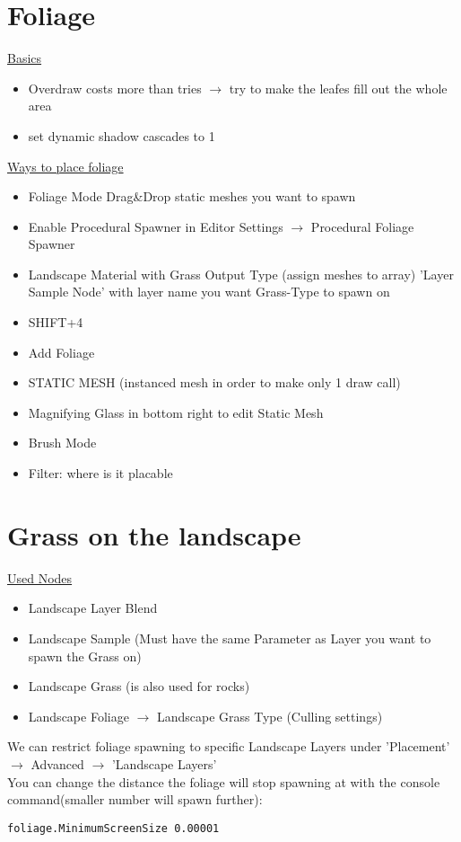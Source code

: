     \section{Foliage}
        \underline{Basics}
        \begin{itemize}
            \item Overdraw costs more than tries $\rightarrow$ try to make the leafes fill out the whole area
            \item set dynamic shadow cascades to 1
        \end{itemize}

        \underline{Ways to place foliage}
        \begin{itemize}
            \item Foliage Mode Drag\&Drop static meshes you want to spawn
            \item Enable Procedural Spawner in Editor Settings $\rightarrow$ Procedural Foliage Spawner
            \item Landscape Material with Grass Output Type (assign meshes to array) 'Layer Sample Node' with layer name you want Grass-Type to spawn on
        \end{itemize}
        \begin{itemize}
            \item SHIFT+4
            \item Add Foliage
            \item STATIC MESH (instanced mesh in order to make only 1 draw call)
            \item Magnifying Glass in bottom right to edit Static Mesh
            \item Brush Mode
            \item Filter: where is it placable
        \end{itemize}


    \section{Grass on the landscape}
        \underline{Used Nodes}
        \begin{itemize}
            \item Landscape Layer Blend
            \item Landscape Sample (Must have the same Parameter as Layer you want to spawn the Grass on)
            \item Landscape Grass (is also used for rocks)
            \item Landscape Foliage $\rightarrow$ Landscape Grass Type (Culling settings)
        \end{itemize}
        We can restrict foliage spawning to specific Landscape Layers under 'Placement' $\rightarrow$ Advanced $\rightarrow$ 'Landscape Layers' \\
\bigskip            
        You can change the distance the foliage will stop spawning at with the
        console command(smaller number will spawn further):
\begin{lstlisting}
foliage.MinimumScreenSize 0.00001            
\end{lstlisting}

      
